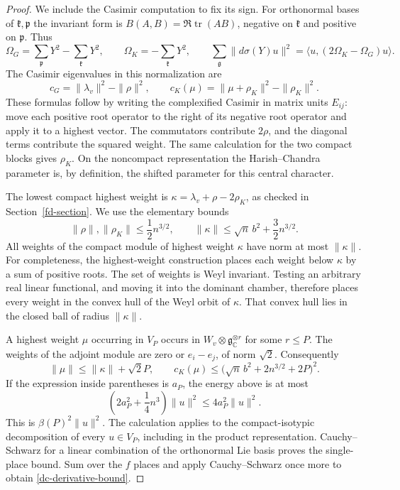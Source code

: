 \begin{proof}
We include the Casimir computation to fix its sign.
For orthonormal bases of \(\mathfrak k,\mathfrak p\)
the invariant form is \(B(A,B)=\Re\operatorname{tr}(AB)\),
negative on \(\mathfrak k\) and positive on
\(\mathfrak p\).  Thus
\[
 \Omega_G=\sum_{\mathfrak p}Y^2-\sum_{\mathfrak k}Y^2,
 \qquad \Omega_K=-\sum_{\mathfrak k}Y^2,
 \qquad
 \sum_{\mathfrak g}\|d\sigma(Y)u\|^2
                    =\langle u,(2\Omega_K-\Omega_G)u\rangle.
\]
The Casimir eigenvalues in this normalization are
\[
 c_G=\|\lambda_v\|^2-\|\rho\|^2,\qquad
 c_K(\mu)=\|\mu+\rho_K\|^2-\|\rho_K\|^2.
\]
These formulas follow by writing the complexified
Casimir in matrix units \(E_{ij}\): move each positive
root operator to the right of its negative root
operator and apply it to a highest vector.  The
commutators contribute \(2\rho\), and the diagonal
terms contribute the squared weight.  The same
calculation for the two compact blocks gives
\(\rho_K\).  On the noncompact representation the
Harish--Chandra parameter is, by definition, the
shifted parameter for this central character.

The lowest compact highest weight is
\(\kappa=\lambda_v+\rho-2\rho_K\), as checked in
Section~\ref{fd-section}.  We use the elementary bounds
\[
 \|\rho\|,\|\rho_K\|\le\frac12 n^{3/2},\qquad
              \|\kappa\|\le\sqrt n\,b^2+\frac32n^{3/2}.
\]
All weights of the compact module of highest weight
\(\kappa\) have norm at most \(\|\kappa\|\).
For completeness, the highest-weight construction
places each weight below \(\kappa\) by a sum of
positive roots.  The set of weights is Weyl invariant.
Testing an arbitrary real linear functional, and
moving it into the dominant chamber, therefore
places every weight in the convex hull of the Weyl
orbit of \(\kappa\).  That convex hull lies in the
closed ball of radius \(\|\kappa\|\).

A highest weight \(\mu\) occurring in \(V_P\) occurs
in \(W_v\otimes\mathfrak g_{\mathbb C}^{\otimes r}\)
for some \(r\le P\).  The weights of the adjoint
module are zero or \(e_i-e_j\), of norm \(\sqrt2\).
Consequently
\[
 \|\mu\|\le\|\kappa\|+\sqrt2P,\qquad
 c_K(\mu)\le
             \bigl(\sqrt n\,b^2+2n^{3/2}+2P\bigr)^2.
\]
If the expression inside parentheses is \(a_P\),
the energy above is at most
\[
 \left(2a_P^2+\frac14 n^3\right)\|u\|^2
                                      \le4a_P^2\|u\|^2.
\]
This is \(\beta(P)^2\|u\|^2\).
The calculation applies to the compact-isotypic
decomposition of every \(u\in V_P\), including in
the product representation.  Cauchy--Schwarz for a
linear combination of the orthonormal Lie basis
proves the single-place bound.  Sum over the \(f\)
places and apply Cauchy--Schwarz once more to obtain
\eqref{dc-derivative-bound}.
\end{proof}

